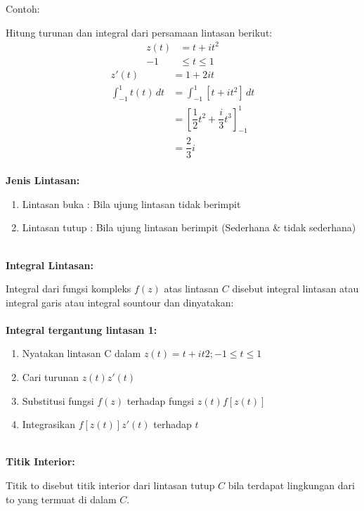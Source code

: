 \documentclass{article}
\begin{document}
    Contoh:

    Hitung turunan dan integral dari persamaan lintasan berikut:
    \begin{align}
        z(t) &= t + it^2
        \nonumber\\
        -1& \leq t \leq 1
        \nonumber
    \end{align}
    \begin{align}
        z'(t)   &= 1 + 2it
        \nonumber\\
        \int_{-1}^{1} t(t) \,dt &= \int_{-1}^{1} [t + it^2] \,dt
        \nonumber\\
                                &= [\dfrac{1}{2}t^2 + \dfrac{i}{3}t^3]_{-1} ^1
        \nonumber\\
                                &= \dfrac{2}{3}i
        \nonumber
    \end{align}
    \leavevmode\\

    \textbf{Jenis Lintasan:}
    \begin{enumerate}
        \item Lintasan buka : Bila ujung lintasan tidak berimpit
        \item Lintasan tutup : Bila ujung lintasan berimpit (Sederhana \& tidak sederhana)
    \end{enumerate}
    \leavevmode\\

    \textbf{Integral Lintasan:}

    Integral dari fungsi kompleks $f(z)$ atas lintasan $C$ disebut integral lintasan atau integral garis atau integral sountour dan dinyatakan:
    \leavevmode\\ \\

    \textbf{Integral tergantung lintasan 1:}
    \begin{enumerate}
        \item Nyatakan lintasan C dalam $z(t) =t +it2 ; -1 \leq t \leq 1$
        \item Cari turunan $z(t) z'(t)$
        \item Substitusi fungsi $f(z)$ terhadap fungsi $z (t)  f[z(t)]$
        \item Integrasikan  $f[z(t)] z'(t)$ terhadap $t$
    \end{enumerate}
    \leavevmode\\

    \textbf{Titik Interior:} 
	
    Titik to disebut titik interior dari lintasan tutup $C$ bila terdapat lingkungan dari to yang termuat di dalam $C$.
\end{document}
